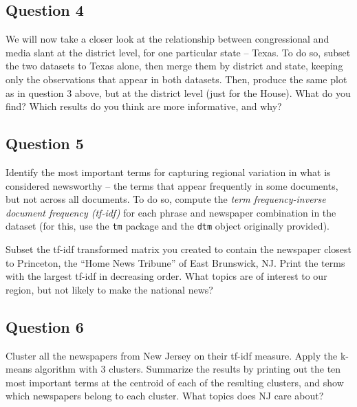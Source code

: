\documentclass[]{article}
\begin{document}
\subsection{Question 4}\label{question-4}

We will now take a closer look at the relationship between congressional
and media slant at the district level, for one particular state --
Texas. To do so, subset the two datasets to Texas alone, then merge them
by district and state, keeping only the observations that appear in both
datasets. Then, produce the same plot as in question 3 above, but at the
district level (just for the House). What do you find? Which results do
you think are more informative, and why?

\subsection{Question 5}\label{question-5}

Identify the most important terms for capturing regional variation in
what is considered newsworthy -- the terms that appear frequently in
some documents, but not across all documents. To do so, compute the
\emph{term frequency-inverse document frequency (tf-idf)} for each
phrase and newspaper combination in the dataset (for this, use the
\texttt{tm} package and the \texttt{dtm} object originally provided).

Subset the tf-idf transformed matrix you created to contain the
newspaper closest to Princeton, the ``Home News Tribune'' of East
Brunswick, NJ. Print the terms with the largest tf-idf in decreasing
order. What topics are of interest to our region, but not likely to make
the national news?

\subsection{Question 6}\label{question-6}

Cluster all the newspapers from New Jersey on their tf-idf measure.
Apply the k-means algorithm with 3 clusters. Summarize the results by
printing out the ten most important terms at the centroid of each of the
resulting clusters, and show which newspapers belong to each cluster.
What topics does NJ care about?
\end{document}
